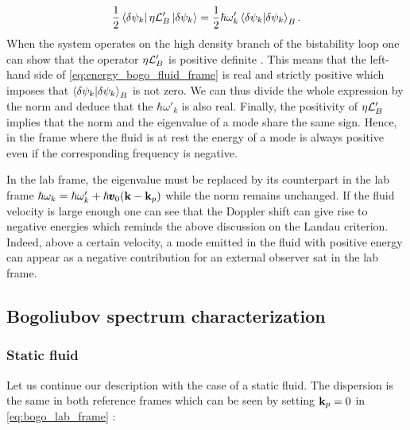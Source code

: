 \begin{equation}
    \dfrac{1}{2}\bra{\delta\psi_k}\eta\mathcal{L}_B'\ket{\delta\psi_k} =\dfrac{1}{2}\hbar\omega'_k\bra{\delta\psi_k}\ket{\delta\psi_k}_B.
    \label{eq:energy_bogo_fluid_frame}
\end{equation}
When the system operates on the high density branch of the bistability loop one can show that the operator $\eta\mathcal{L}_B'$ is positive definite \cite{amelio_galilean_2020}.
This means that the left-hand side of \autoref{eq:energy_bogo_fluid_frame} is real and strictly positive which imposes 
that $\bra{\delta\psi_k}\ket{\delta\psi_k}_B$ is not zero. We can thus divide the whole expression by the norm and deduce that the $\hbar\omega'_k$ is also real.
Finally, the positivity of $\eta\mathcal{L}_B'$ implies that the norm and the eigenvalue of a mode share the same sign. Hence,
in the frame where the fluid is at rest the energy of a mode is always positive even if the corresponding frequency is negative.

In the lab frame, the eigenvalue must be replaced by its counterpart in the lab frame $\hbar\omega_k=\hbar\omega'_k+\hbar \pmb{v}_0(\mathbf{k}-\mathbf{k}_p)$ while the norm remains unchanged.
If the fluid velocity is large enough one can see that the Doppler shift can give rise to negative energies which reminds the above discussion on the Landau criterion. Indeed, above a certain 
velocity, a mode emitted in the fluid with positive energy can appear as a negative contribution for an external observer sat in the lab frame.


\subsection{Bogoliubov spectrum characterization}
 
\subsubsection{Static fluid}
Let us continue our description with the case of a static fluid. The dispersion is the same in both reference frames which can be seen by setting $\mathbf{k}_p=0$ 
in \autoref{eq:bogo_lab_frame} :

